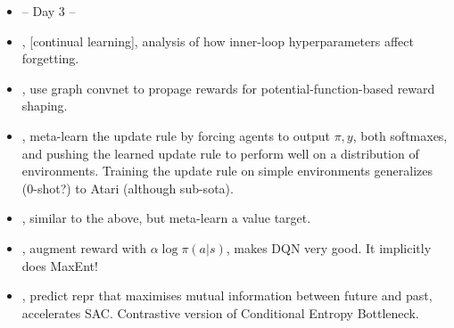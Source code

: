 \begin{itemize}
  \item -- Day 3 --
  \item \citet{mirzadeh2020understanding}, [continual learning], analysis of how inner-loop hyperparameters affect forgetting.
  \item \citet{klissarov2020reward}, use graph convnet to propage rewards for potential-function-based reward shaping.
  \item \citet{oh2020discovering}, meta-learn the update rule by forcing agents to output $\pi,y$, both softmaxes, and pushing the learned update rule to perform well on a distribution of environments. Training the update rule on simple environments generalizes (0-shot?) to Atari (although sub-sota).
  \item \citet{xu2020meta}, similar to the above, but meta-learn a value target.
  \item \citet{vieillard2020munchausen}, augment reward with $\alpha \log \pi(a|s)$, makes DQN very good. It implicitly does MaxEnt!
  \item \citet{lee2020predictive}, predict repr that maximises mutual information between future and past, accelerates SAC. Contrastive version of Conditional Entropy Bottleneck.
\end{itemize}

